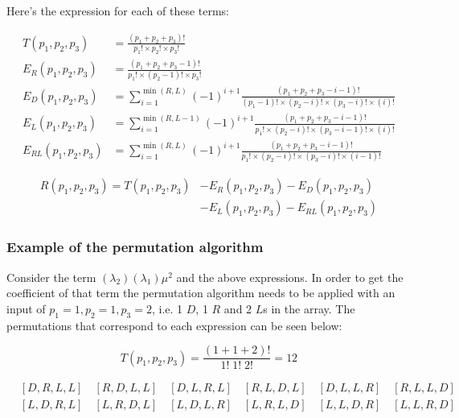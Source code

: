 Here's the expression for each of these terms:

\begin{align}
    T(p_1, p_2, p_3) &= \frac{(p_1 + p_2 + p_3)!}{p_1! \times p_2! \times p_3!} \\
    E_R(p_1, p_2, p_3) &= \frac{(p_1 + p_2 + p_3 - 1)!}
    {p_1! \times (p_2-1)! \times p_3!} \\
    E_D(p_1, p_2, p_3) &= \sum_{i=1}^{\min(R,L)} (-1)^{i+1}
    \frac{(p_1 + p_2 + p_3 - i - 1)!}
    {(p_1 - 1)! \times (p_2 - i)! \times (p_3 - i)! \times (i)!} \\
    E_L(p_1, p_2, p_3) &= \sum_{i=1}^{\min(R,L-1)} (-1)^{i+1}
    \frac{(p_1 + p_2 + p_3 - i - 1)!}
    {p_1! \times (p_2 - i)! \times (p_3 - i - 1)! \times (i)!} \\
    E_{RL}(p_1, p_2, p_3) &= \sum_{i=1}^{\min(R,L)} (-1)^{i+1}
    \frac{(p_1 + p_2 + p_3 - i - 1)!}
    {p_1! \times (p_2 - i)! \times (p_3 - i)! \times (i - 1)!}
\end{align}

\begin{align*}
    R(p_1, p_2, p_3) = T(p_1, p_2, p_3) & - E_R(p_1, p_2, p_3) -
    E_D(p_1, p_2, p_3) \\
    & - E_L(p_1, p_2, p_3) - E_{RL}(p_1, p_2, p_3)
\end{align*}

\subsubsection{Example of the permutation algorithm}
Consider the term \((\lambda_2) (\lambda_1) \mu^2\) and the above expressions.
In order to get the coefficient of that term the permutation algorithm needs to
be applied with an input of \(p_1=1, p_2=1, p_3=2\), i.e. 1 \(D\), 1 \(R\) and 2
\(L\)s in the array.
The permutations that correspond to each expression can be seen below:

\begin{equation*}
    T(p_1, p_2, p_3) = \frac{(1+1+2)!}{1! \; 1! \; 2!} = 12
\end{equation*}

\begin{align*}
    & [D, R, L, L] \quad [R, D, L, L] \quad [D, L, R, L] \quad
    [R, L, D, L] \quad [D, L, L, R] \quad [R, L, L, D] \\
    & [L, D, R, L] \quad [L, R, D, L] \quad [L, D, L, R] \quad
    [L, R, L, D] \quad [L, L, D, R] \quad [L, L, R, D]
\end{align*}


